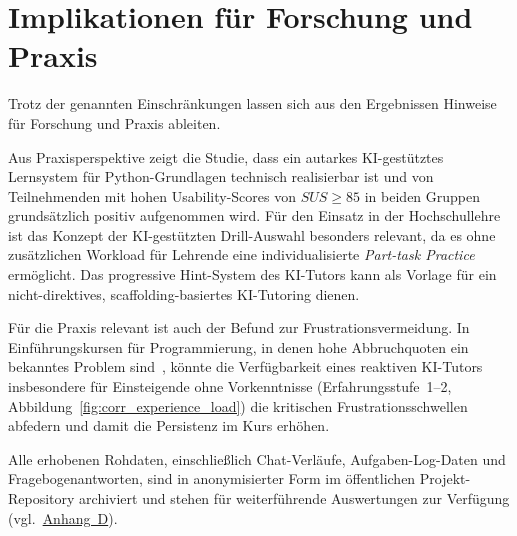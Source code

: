 \clearpage
\section{Implikationen für Forschung und Praxis}\label{sec:implikationen}

Trotz der genannten Einschränkungen lassen sich aus den Ergebnissen Hinweise für Forschung und Praxis ableiten.

Aus Praxisperspektive zeigt die Studie, dass ein autarkes KI-gestütztes Lernsystem für Python-Grundlagen technisch realisierbar ist und von Teilnehmenden mit hohen Usability-Scores von \(SUS \geq 85\) in beiden Gruppen grundsätzlich positiv aufgenommen wird. Für den Einsatz in der Hochschullehre ist das Konzept der KI-gestützten Drill-Auswahl besonders relevant, da es ohne zusätzlichen Workload für Lehrende eine individualisierte \textit{Part-task Practice} ermöglicht. Das progressive Hint-System des KI-Tutors kann als Vorlage für ein nicht-direktives, scaffolding-basiertes KI-Tutoring dienen.

Für die Praxis relevant ist auch der Befund zur Frustrationsvermeidung. In Einführungskursen für Programmierung, in denen hohe Abbruchquoten ein bekanntes Problem sind~\cite{bennedsen2007}, könnte die Verfügbarkeit eines reaktiven KI-Tutors insbesondere für Einsteigende ohne Vorkenntnisse (Erfahrungsstufe~1--2, Abbildung~\ref{fig:corr_experience_load}) die kritischen Frustrationsschwellen abfedern und damit die Persistenz im Kurs erhöhen.

Alle erhobenen Rohdaten, einschließlich Chat-Verläufe, Aufgaben-Log-Daten und Fragebogenantworten, sind in anonymisierter Form im öffentlichen Projekt-Repository archiviert und stehen für weiterführende Auswertungen zur Verfügung (vgl.\ \hyperref[appendix:daten]{Anhang~D}).


